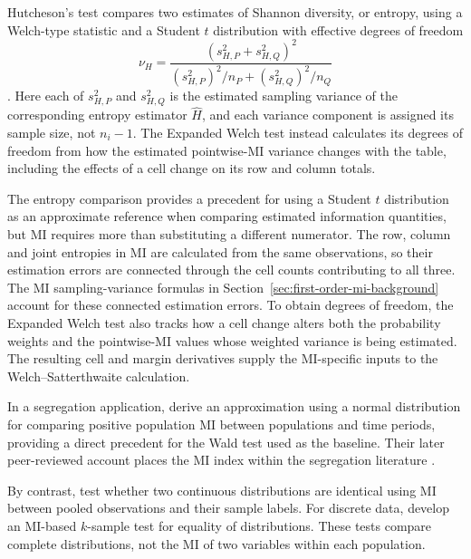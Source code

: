 Hutcheson's test compares two estimates of Shannon diversity, or entropy,
using a Welch-type statistic and a Student \(t\) distribution with effective
degrees of freedom
\begin{equation}
  \nu_H=
  \frac{(s_{H,P}^2+s_{H,Q}^2)^2}
       {(s_{H,P}^2)^2/n_P+(s_{H,Q}^2)^2/n_Q}
  \label{eq:hutcheson-df}
\end{equation}
\citep{hutcheson1970}. Here each of
\(s_{H,P}^2\) and \(s_{H,Q}^2\) is the estimated sampling variance of the
corresponding entropy estimator \(\widehat H\), and each variance component
is assigned its sample size, not \(n_i-1\).
The Expanded Welch test instead calculates its degrees of freedom from how the
estimated pointwise-MI variance changes with the table, including the effects of a
cell change on its row and column totals.

The entropy comparison provides a precedent for using a Student \(t\)
distribution as an approximate reference when comparing estimated
information quantities, but MI requires more than substituting a different
numerator. The row, column and joint entropies in MI are calculated from the same
observations, so their estimation errors are connected through the cell
counts contributing to all three.
The MI sampling-variance formulas in Section~\ref{sec:first-order-mi-background}
account for these connected estimation errors. To obtain degrees of freedom,
the Expanded Welch test also tracks how a cell change alters both the probability
weights and the pointwise-MI values whose weighted variance is being
estimated. The resulting cell and margin derivatives supply the MI-specific
inputs to the Welch--Satterthwaite calculation.

In a segregation application, \citet{mora2009} derive an approximation using
a normal distribution for comparing positive population MI between
populations and time periods, providing a direct precedent for the Wald
test used as the baseline. Their later
peer-reviewed account places the MI index within the segregation literature
\citep{mora2011}.

By contrast, \citet{guha2014} test whether two continuous distributions are identical
using MI between pooled observations and their sample labels.
For discrete data, \citet{drake2014} develop an MI-based \(k\)-sample test
for equality of distributions. These tests compare complete distributions,
not the MI of two variables within each population.

\medskip
{}

